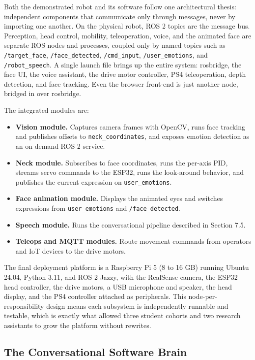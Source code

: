 \documentclass[11pt,a4paper]{article}
\begin{document}
Both the demonstrated robot and its software follow one architectural thesis: independent components that communicate only through messages, never by importing one another. On the physical robot, ROS 2 topics are the message bus. Perception, head control, mobility, teleoperation, voice, and the animated face are separate ROS nodes and processes, coupled only by named topics such as \texttt{/target\_face}, \texttt{/face\_detected}, \texttt{/cmd\_input}, \texttt{/user\_emotions}, and \texttt{/robot\_speech}. A single launch file brings up the entire system: rosbridge, the face UI, the voice assistant, the drive motor controller, PS4 teleoperation, depth detection, and face tracking. Even the browser front-end is just another node, bridged in over rosbridge.

The integrated modules are:

\begin{itemize}
\item \textbf{Vision module.} Captures camera frames with OpenCV, runs face tracking and publishes offsets to \texttt{neck\_coordinates}, and exposes emotion detection as an on-demand ROS 2 service.
\item \textbf{Neck module.} Subscribes to face coordinates, runs the per-axis PID, streams servo commands to the ESP32, runs the look-around behavior, and publishes the current expression on \texttt{user\_emotions}.
\item \textbf{Face animation module.} Displays the animated eyes and switches expressions from \texttt{user\_emotions} and \texttt{/face\_detected}.
\item \textbf{Speech module.} Runs the conversational pipeline described in Section 7.5.
\item \textbf{Teleops and MQTT modules.} Route movement commands from operators and IoT devices to the drive motors.
\end{itemize}

The final deployment platform is a Raspberry Pi 5 (8 to 16 GB) running Ubuntu 24.04, Python 3.11, and ROS 2 Jazzy, with the RealSense camera, the ESP32 head controller, the drive motors, a USB microphone and speaker, the head display, and the PS4 controller attached as peripherals. This node-per-responsibility design means each subsystem is independently runnable and testable, which is exactly what allowed three student cohorts and two research assistants to grow the platform without rewrites.

\subsection{The Conversational Software Brain}
\label{sec:brain}
\end{document}
